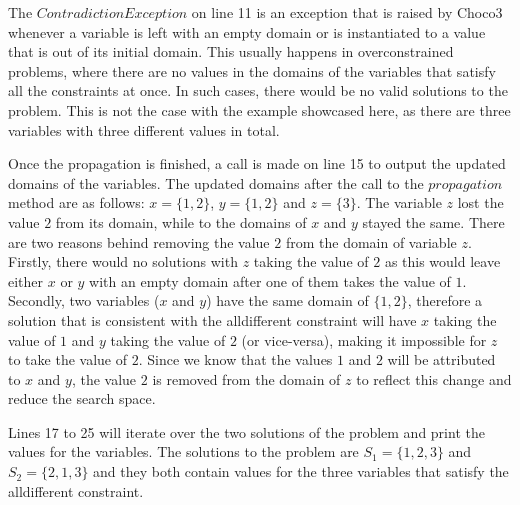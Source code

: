 \documentclass{l4proj}
\begin{document}
\noindent The $ContradictionException$ on line 11 is an exception that is raised by Choco3 whenever a variable is left with an empty domain or is instantiated to a value that is out of its initial domain. This usually happens in overconstrained problems, where there are no values in the domains of the variables that satisfy all the constraints at once. In such cases, there would be no valid solutions to the problem. This is not the case with the example showcased here, as there are three variables with three different values in total.

\noindent Once the propagation is finished, a call is made on line 15 to output the updated domains of the variables. The updated domains after the call to the $propagation$ method are as follows: $x = \{1, 2\}$, $y = \{1, 2\}$ and $z = \{3\}$. The variable $z$ lost the value $2$ from its domain, while to the domains of $x$ and $y$ stayed the same. There are two reasons behind removing the value $2$ from the domain of variable $z$. Firstly, there would no solutions with $z$ taking the value of $2$ as this would leave either $x$ or $y$ with an empty domain after one of them takes the value of $1$. Secondly, two variables ($x$ and $y$) have the same domain of $\{1, 2\}$, therefore a solution that is consistent with the alldifferent constraint will have $x$ taking the value of $1$ and $y$ taking the value of $2$ (or vice-versa), making it impossible for $z$ to take the value of $2$.  Since we know that the values $1$ and $2$ will be attributed to $x$ and $y$, the value $2$ is removed from the domain of $z$ to reflect this change and reduce the search space.

\noindent Lines 17 to 25 will iterate over the two solutions of the problem and print the values for the variables. The solutions to the problem are $S_1 = \{1, 2, 3\}$ and $S_2 = \{2, 1, 3\}$ and they both contain values for the three variables that satisfy the alldifferent constraint.
\end{document}
